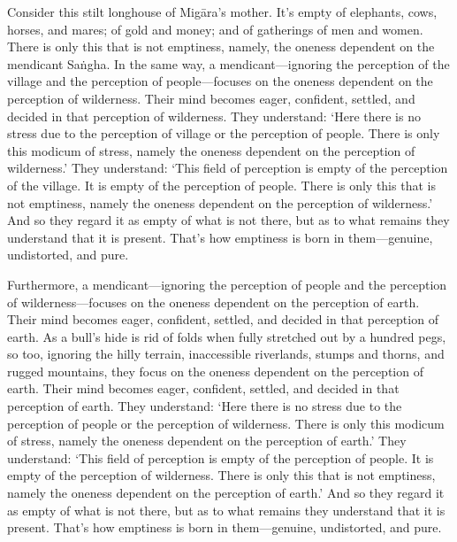 \documentclass[12pt,openany]{book}%
\begin{document}
Consider this stilt longhouse of \textsanskrit{Migāra}’s mother. It’s empty of elephants, cows, horses, and mares; of gold and money; and of gatherings of men and women. There is only this that is not emptiness, namely, the oneness dependent on the mendicant \textsanskrit{Saṅgha}. In the same way, a mendicant—ignoring the perception of the village and the perception of people—focuses on the oneness dependent on the perception of wilderness. Their mind becomes eager, confident, settled, and decided in that perception of wilderness. They understand: ‘Here there is no stress due to the perception of village or the perception of people. There is only this modicum of stress, namely the oneness dependent on the perception of wilderness.’ They understand: ‘This field of perception is empty of the perception of the village. It is empty of the perception of people. There is only this that is not emptiness, namely the oneness dependent on the perception of wilderness.’ And so they regard it as empty of what is not there, but as to what remains they understand that it is present. That’s how emptiness is born in them—genuine, undistorted, and pure. 

Furthermore, a mendicant—ignoring the perception of people and the perception of wilderness—focuses on the oneness dependent on the perception of earth. Their mind becomes eager, confident, settled, and decided in that perception of earth. As a bull’s hide is rid of folds when fully stretched out by a hundred pegs, so too, ignoring the hilly terrain, inaccessible riverlands, stumps and thorns, and rugged mountains, they focus on the oneness dependent on the perception of earth. Their mind becomes eager, confident, settled, and decided in that perception of earth. They understand: ‘Here there is no stress due to the perception of people or the perception of wilderness. There is only this modicum of stress, namely the oneness dependent on the perception of earth.’ They understand: ‘This field of perception is empty of the perception of people. It is empty of the perception of wilderness. There is only this that is not emptiness, namely the oneness dependent on the perception of earth.’ And so they regard it as empty of what is not there, but as to what remains they understand that it is present. That’s how emptiness is born in them—genuine, undistorted, and pure. 
\end{document}
